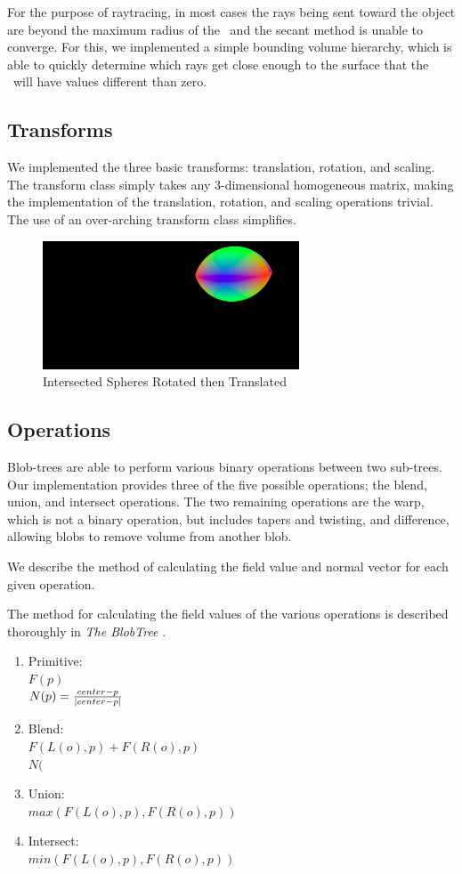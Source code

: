 \documentclass[conference]{acmsiggraph}
\begin{document}
For the purpose of raytracing, in most cases the rays being sent toward the
object are beyond the maximum radius of the \fff\ and the secant method is
unable to converge. For this, we implemented a simple bounding volume
hierarchy, which is able to quickly determine which rays get close enough to
the surface that the \fff\ will have values different than zero.

\subsection{Transforms}
We implemented the three basic transforms: translation, rotation, and scaling.
The transform class simply takes any 3-dimensional homogeneous matrix, making
the implementation of the translation, rotation, and scaling operations
trivial. The use of an over-arching transform class simplifies.

\begin{figure}[htb]
	\centering
	\includegraphics[height=1.5in]{images/intersect_rotate.png}
	\caption{Intersected Spheres Rotated then Translated}
\end{figure}

\subsection{Operations}
Blob-trees are able to perform various binary operations between two
sub-trees. Our implementation provides three of the five possible operations;
the blend, union, and intersect operations. The two remaining operations are
the warp, which is not a binary operation, but includes tapers and twisting,
and difference, allowing blobs to remove volume from another blob.

We describe the method of calculating the field value and normal vector for
each given operation.

The method for calculating the field values of the various operations is
described thoroughly in \textit{The BlobTree} \cite{Wyvill}.

\begin{enumerate}
	\item Primitive:\\
		$F(p)$\\
		$N(p) = {center - p \over | center - p |}$
	\item Blend:\\
		$F(L(o), p) + F(R(o), p)$\\
		$N( $

	\item Union:\\
		$max(F(L(o), p), F(R(o), p))$
	\item Intersect:\\
		$min(F(L(o), p), F(R(o), p))$
\end{enumerate}
\end{document}
